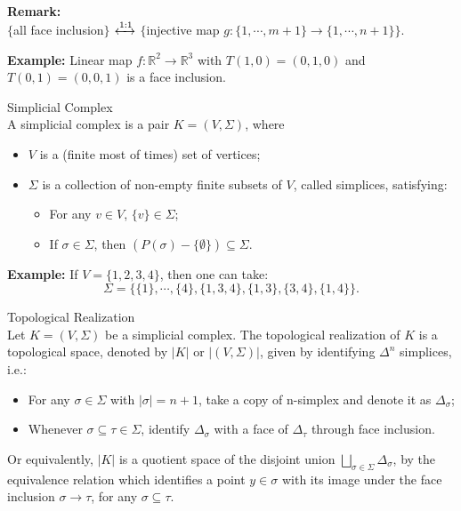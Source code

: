 \noindent\textbf{Remark:}\\
$\{$all face inclusion$\}$ $\xleftrightarrow{1:1}$ $\{$injective map $g: \{ 1,\cdots, m+1 \} \rightarrow  \{ 1,\cdots, n+1 \}$$\}$.

\noindent\textbf{Example:} Linear map $f: \mathbb{R}^2 \rightarrow \mathbb{R} ^3$ with $T(1,0) = (0,1,0)$ and $T(0,1) = (0,0,1)$ is a face inclusion.

\begin{definition}{Simplicial Complex}\\
A simplicial complex is a pair $K= (V, \Sigma)$, where
\begin{itemize}
    \item $V$ is a (finite most of times) set of vertices;
    \item $\Sigma$ is a collection of non-empty finite subsets of $V$, called simplices, satisfying:
    \begin{itemize}
        \item For any $v \in V$, $\{ v \} \in \Sigma$;
        \item If $\sigma \in \Sigma$, then $(P(\sigma) - \{ \emptyset \}) \subseteq \Sigma$.
    \end{itemize}
\end{itemize}
\end{definition}

\noindent\textbf{Example:} If $V = \{ 1,2,3,4\}$, then one can take:
$$\Sigma = \{ \{ 1\}, \cdots, \{ 4\}, \{ 1,3,4\}, \{ 1,3\} , \{ 3,4\}, \{ 1,4\} \}.$$

\begin{definition}{Topological Realization}\\
Let $K = (V , \Sigma)$ be a simplicial complex. The topological realization of $K$ is a topological space, denoted by $|K|$ or $|(V,\Sigma)|$, given by identifying $\Delta ^n$ simplices, i.e.:
\begin{itemize}
    \item For any $\sigma \in \Sigma$ with $|\sigma| = n+1$, take a copy of n-simplex and denote it as $\Delta_{\sigma}$;
    \item Whenever $\sigma \subseteq \tau \in \Sigma$, identify $\Delta_\sigma$ with a face of $\Delta_\tau$ through face inclusion.
\end{itemize}
Or equivalently, $|K|$ is a quotient space of the disjoint union $\bigsqcup _{\sigma \in \Sigma} \Delta_\sigma$, by the equivalence relation which identifies a point $y\in \sigma$ with its image under the face inclusion $\sigma \rightarrow \tau$, for any $\sigma \subseteq \tau$.
\end{definition}

